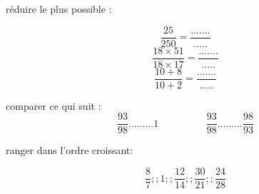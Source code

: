 \documentclass[addpoints]{exam}
\begin{document}
\begin{tcolorbox}[title=Exercice 3]
	\begin{questions}
		\question réduire le plus possible :
		
		\[\dfrac{25}{250}=\dfrac{.......}{.....}\]
\[\dfrac{18\times 51}{18 \times 17}=\dfrac{.......}{.....}\]
\[\dfrac{10+8}{10+2}=\dfrac{.......}{.....}\]
		
	\end{questions}
\end{tcolorbox}		

\begin{tcolorbox}[title=Exercice 4]
	\begin{questions}
		\question comparer ce qui suit  :	
$$\dfrac{93}{98}......... 1 \hspace{1cm}   \hspace{1cm}
\dfrac{93}{98}.........\dfrac{98}{93}$$

\question ranger dans l'ordre croissant:

$$\dfrac{8}{7} ;; 1 ;; \dfrac{12}{14} ;; \dfrac{30}{21}  ;; \dfrac{24}{28}$$	

\end{questions}
\end{tcolorbox}	
	
	
\end{document}
